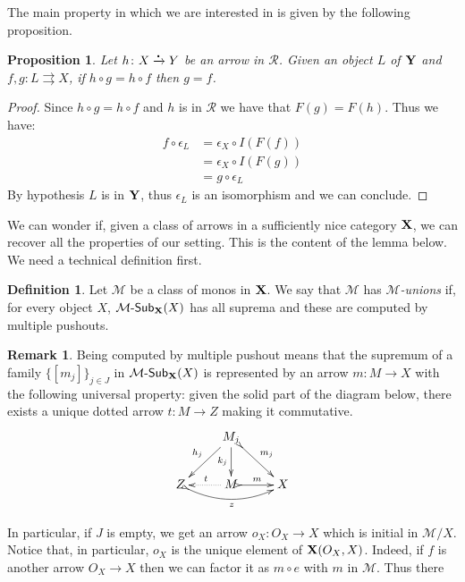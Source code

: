 \documentclass[a4paper]{article}
\newcommand{\sub}[3]{{\mathcal{#1}}\textrm{-}\mathsf{Sub}_{\textbf {\textup{#2}}}(#3)}
\newcommand{\mini}[0]{\scalebox{.4}{$\bullet$}}
\newcommand{\rto}[0]{\xrightarrow{\mini}}
\def\X{\textbf {\textup{X}}}
\def\Y{\textbf {\textup{Y}}}
\def\Z{\textbf {\textup{Z}}}
\newtheorem{proposition}[theorem]{Proposition}
\theoremstyle{definition}
\newtheorem{definition}[theorem]{Definition}
\newtheorem{remark}[theorem]{Remark}
\begin{document}
The main property in which we are interested in is given by the following proposition.

\begin{proposition}\label{prop:main}
	Let $h\colon X \rto Y$ be an arrow in $\mathcal{R}$. Given an object $L$ of $\Y$ and $f,g\colon L\rightrightarrows X$, if $h\circ g=h\circ f$ then $g=f$.
\end{proposition}
\begin{proof}
	Since $h\circ g=h\circ f$ and $h$ is in $\mathcal{R}$ we have that $F(g)=F(h)$. Thus we have:
	\begin{align*}
		f\circ \epsilon_{L}&=\epsilon_X\circ I(F(f))\\&=\epsilon_X\circ I(F(g))\\&=g\circ \epsilon_L
	\end{align*}
	By hypothesis $L$ is in $\Y$, thus $\epsilon_L$ is an isomorphism and we can conclude.
\end{proof}


We can wonder if, given a class of arrows in a sufficiently nice category $\X$, we can recover all the properties of our setting. This is the content of the lemma below. We need a technical definition first.

\begin{definition}
	Let $\mathcal{M}$ be a class of monos in $\X$. We say that $\mathcal{M}$ has \emph{$\mathcal{M}$-unions} if, for every object $X$,  $\sub{M}{\X}{X}$ has all suprema and these are computed by multiple pushouts. 
\end{definition}

\begin{remark}
	Being computed by multiple pushout means that the supremum of a family $\{[m_j]\}_{j\in J}$ in $\sub{M}{\X}{X}$ is represented by an arrow $m\colon M\to X$ with the following universal property: given the solid part of the diagram below, there exists a unique dotted arrow $t\colon M\to Z$ making it commutative.
	\[\xymatrix{& M_j \ar[d]_{k_j} \ar@{>->}[dr]^{m_j} \\Z  \ar@{<-}[ur]^{h_j} \ar@{>->}@/_.4cm/[rr]_{z} \ar@{<.}[r]^t & M \ar@{>->}[r]^m & X }\]
	
	In particular, if $J$ is empty, we get an arrow $o_X\colon O_X\to X$ which is initial in $\mathcal{M}/X$. Notice that, in particular, $o_X$ is the unique element of $\X(O_X, X)$. Indeed, if $f$ is another arrow $O_X\to X$ then we can factor it as $m\circ e$ with $m$ in $\mathcal{M}$. Thus there 
\end{remark}
\end{document}
